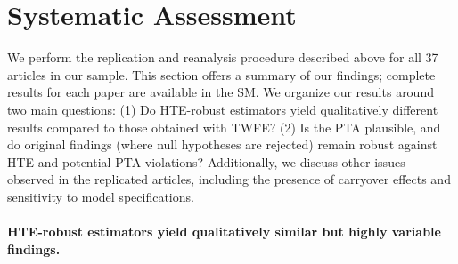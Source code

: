 \documentclass[12pt]{article}
\begin{document}
%  
\FloatBarrier

                                                                           

                                                                              
\section{Systematic Assessment}\label{sc:results}

We perform the replication and reanalysis procedure described above for all 37 articles in our sample. This section offers a summary of our findings; complete results for each paper are available in the SM. We organize our results around two main questions: (1) Do HTE-robust estimators yield qualitatively different results compared to those obtained with TWFE? (2) Is the PTA plausible, and do original findings (where null hypotheses are rejected) remain robust against HTE and potential PTA violations? Additionally, we discuss other issues observed in the replicated articles, including the presence of carryover effects and sensitivity to model specifications.




                             

\paragraph*{HTE-robust estimators yield qualitatively similar but highly variable findings.}
\end{document}
